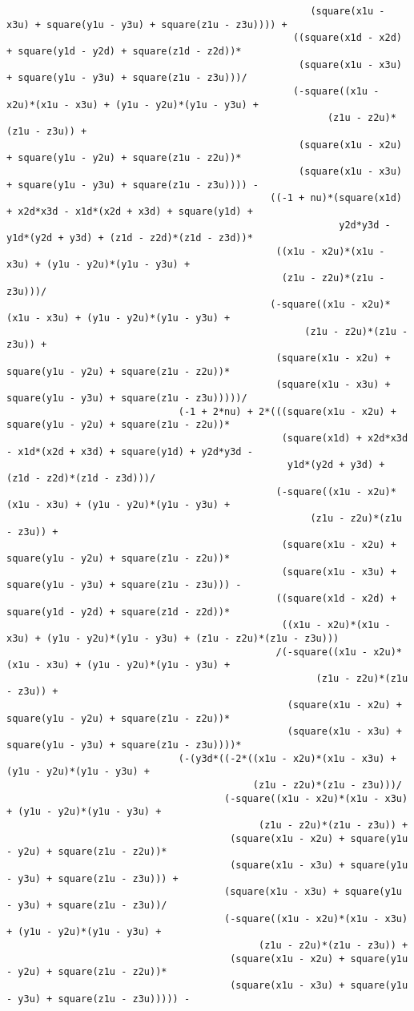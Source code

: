 \begin{lstlisting}
													 (square(x1u - x3u) + square(y1u - y3u) + square(z1u - z3u)))) + 
												  ((square(x1d - x2d) + square(y1d - y2d) + square(z1d - z2d))*
												   (square(x1u - x3u) + square(y1u - y3u) + square(z1u - z3u)))/
												  (-square((x1u - x2u)*(x1u - x3u) + (y1u - y2u)*(y1u - y3u) + 
														(z1u - z2u)*(z1u - z3u)) + 
												   (square(x1u - x2u) + square(y1u - y2u) + square(z1u - z2u))*
												   (square(x1u - x3u) + square(y1u - y3u) + square(z1u - z3u)))) - 
											  ((-1 + nu)*(square(x1d) + x2d*x3d - x1d*(x2d + x3d) + square(y1d) + 
														  y2d*y3d - y1d*(y2d + y3d) + (z1d - z2d)*(z1d - z3d))*
											   ((x1u - x2u)*(x1u - x3u) + (y1u - y2u)*(y1u - y3u) + 
												(z1u - z2u)*(z1u - z3u)))/
											  (-square((x1u - x2u)*(x1u - x3u) + (y1u - y2u)*(y1u - y3u) + 
													(z1u - z2u)*(z1u - z3u)) + 
											   (square(x1u - x2u) + square(y1u - y2u) + square(z1u - z2u))*
											   (square(x1u - x3u) + square(y1u - y3u) + square(z1u - z3u)))))/
							  (-1 + 2*nu) + 2*(((square(x1u - x2u) + square(y1u - y2u) + square(z1u - z2u))*
												(square(x1d) + x2d*x3d - x1d*(x2d + x3d) + square(y1d) + y2d*y3d - 
												 y1d*(y2d + y3d) + (z1d - z2d)*(z1d - z3d)))/
											   (-square((x1u - x2u)*(x1u - x3u) + (y1u - y2u)*(y1u - y3u) + 
													 (z1u - z2u)*(z1u - z3u)) + 
												(square(x1u - x2u) + square(y1u - y2u) + square(z1u - z2u))*
												(square(x1u - x3u) + square(y1u - y3u) + square(z1u - z3u))) - 
											   ((square(x1d - x2d) + square(y1d - y2d) + square(z1d - z2d))*
												((x1u - x2u)*(x1u - x3u) + (y1u - y2u)*(y1u - y3u) + (z1u - z2u)*(z1u - z3u)))
											   /(-square((x1u - x2u)*(x1u - x3u) + (y1u - y2u)*(y1u - y3u) + 
													  (z1u - z2u)*(z1u - z3u)) + 
												 (square(x1u - x2u) + square(y1u - y2u) + square(z1u - z2u))*
												 (square(x1u - x3u) + square(y1u - y3u) + square(z1u - z3u))))*
							  (-(y3d*((-2*((x1u - x2u)*(x1u - x3u) + (y1u - y2u)*(y1u - y3u) + 
										   (z1u - z2u)*(z1u - z3u)))/
									  (-square((x1u - x2u)*(x1u - x3u) + (y1u - y2u)*(y1u - y3u) + 
											(z1u - z2u)*(z1u - z3u)) + 
									   (square(x1u - x2u) + square(y1u - y2u) + square(z1u - z2u))*
									   (square(x1u - x3u) + square(y1u - y3u) + square(z1u - z3u))) + 
									  (square(x1u - x3u) + square(y1u - y3u) + square(z1u - z3u))/
									  (-square((x1u - x2u)*(x1u - x3u) + (y1u - y2u)*(y1u - y3u) + 
											(z1u - z2u)*(z1u - z3u)) + 
									   (square(x1u - x2u) + square(y1u - y2u) + square(z1u - z2u))*
									   (square(x1u - x3u) + square(y1u - y3u) + square(z1u - z3u))))) - 

\end{lstlisting}
